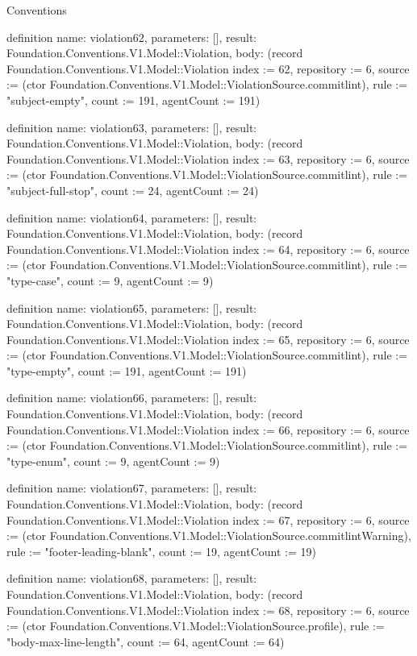 \begin{lexlean}{Conventions}
\begin{semanticmodule}
definition{
  name: violation62,
  parameters: [],
  result: Foundation.Conventions.V1.Model::Violation,
  body: (record Foundation.Conventions.V1.Model::Violation {index := 62, repository := 6, source := (ctor Foundation.Conventions.V1.Model::ViolationSource.commitlint), rule := "subject-empty", count := 191, agentCount := 191})
}

definition{
  name: violation63,
  parameters: [],
  result: Foundation.Conventions.V1.Model::Violation,
  body: (record Foundation.Conventions.V1.Model::Violation {index := 63, repository := 6, source := (ctor Foundation.Conventions.V1.Model::ViolationSource.commitlint), rule := "subject-full-stop", count := 24, agentCount := 24})
}

definition{
  name: violation64,
  parameters: [],
  result: Foundation.Conventions.V1.Model::Violation,
  body: (record Foundation.Conventions.V1.Model::Violation {index := 64, repository := 6, source := (ctor Foundation.Conventions.V1.Model::ViolationSource.commitlint), rule := "type-case", count := 9, agentCount := 9})
}

definition{
  name: violation65,
  parameters: [],
  result: Foundation.Conventions.V1.Model::Violation,
  body: (record Foundation.Conventions.V1.Model::Violation {index := 65, repository := 6, source := (ctor Foundation.Conventions.V1.Model::ViolationSource.commitlint), rule := "type-empty", count := 191, agentCount := 191})
}

definition{
  name: violation66,
  parameters: [],
  result: Foundation.Conventions.V1.Model::Violation,
  body: (record Foundation.Conventions.V1.Model::Violation {index := 66, repository := 6, source := (ctor Foundation.Conventions.V1.Model::ViolationSource.commitlint), rule := "type-enum", count := 9, agentCount := 9})
}

definition{
  name: violation67,
  parameters: [],
  result: Foundation.Conventions.V1.Model::Violation,
  body: (record Foundation.Conventions.V1.Model::Violation {index := 67, repository := 6, source := (ctor Foundation.Conventions.V1.Model::ViolationSource.commitlintWarning), rule := "footer-leading-blank", count := 19, agentCount := 19})
}

definition{
  name: violation68,
  parameters: [],
  result: Foundation.Conventions.V1.Model::Violation,
  body: (record Foundation.Conventions.V1.Model::Violation {index := 68, repository := 6, source := (ctor Foundation.Conventions.V1.Model::ViolationSource.profile), rule := "body-max-line-length", count := 64, agentCount := 64})
}


\end{semanticmodule}
\end{lexlean}
